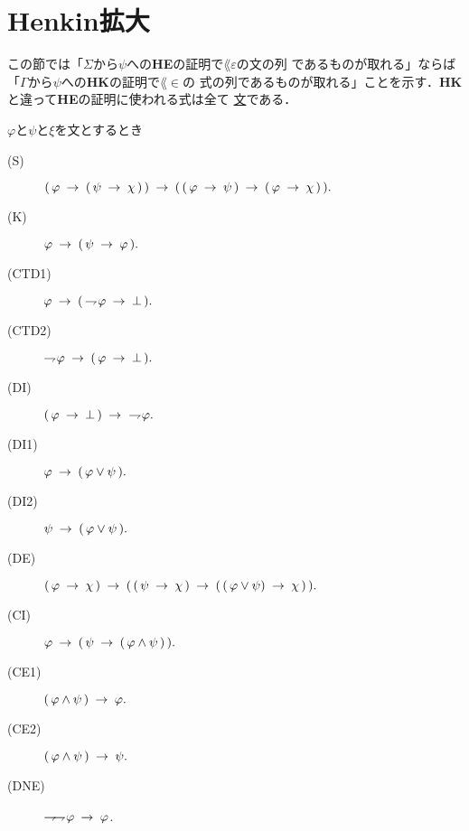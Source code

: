 \section{Henkin拡大}
\label{sec:Henkin_expansion}
	この節では「$\Sigma$から$\psi$への{\bf HE}の証明で$\lang{\varepsilon}$の文の列
	であるものが取れる」ならば「$\Gamma$から$\psi$への{\bf HK}の証明で$\lang{\in}$の
	式の列であるものが取れる」ことを示す．{\bf HK}と違って{\bf HE}の証明に使われる式は全て
	\underline{文}である．
	
	\begin{screen}
		\begin{logicalaxm}
			$\varphi$と$\psi$と$\xi$を文とするとき
			\begin{description}
				\item[(S)] $(\, \varphi \rarrow (\, \psi \rarrow \chi\, )\, ) 
					\rarrow (\, (\, \varphi \rarrow \psi\, )
					\rarrow (\, \varphi \rarrow \chi\, )\, ).$
				\item[(K)] $\varphi \rarrow (\, \psi \rarrow \varphi\, ).$
				\item[(CTD1)] $\varphi \rarrow (\, \negation \varphi \rarrow \bot\, ).$
				\item[(CTD2)] $\negation \varphi \rarrow (\, \varphi \rarrow \bot\, ).$
				\item[(DI)] $(\, \varphi \rarrow \bot\, ) \rarrow\ \negation \varphi.$
				\item[(DI1)] $\varphi \rarrow (\, \varphi \vee \psi\, ).$
				\item[(DI2)] $\psi \rarrow (\, \varphi \vee \psi\, ).$
				\item[(DE)] $(\, \varphi \rarrow \chi\, ) \rarrow 
					(\, (\, \psi \rarrow \chi\, ) 
					\rarrow (\, (\, \varphi \vee \psi) \rarrow \chi\, )\, ).$
				\item[(CI)] $\varphi \rarrow (\, \psi \rarrow (\, \varphi \wedge \psi\, )\, ).$
				\item[(CE1)] $(\, \varphi \wedge \psi\, ) \rarrow \varphi.$
				\item[(CE2)] $(\, \varphi \wedge \psi\, ) \rarrow \psi.$
				\item[(DNE)] $\negation \negation \varphi \rarrow \varphi$.
			\end{description}
		\end{logicalaxm}
	\end{screen}
	
